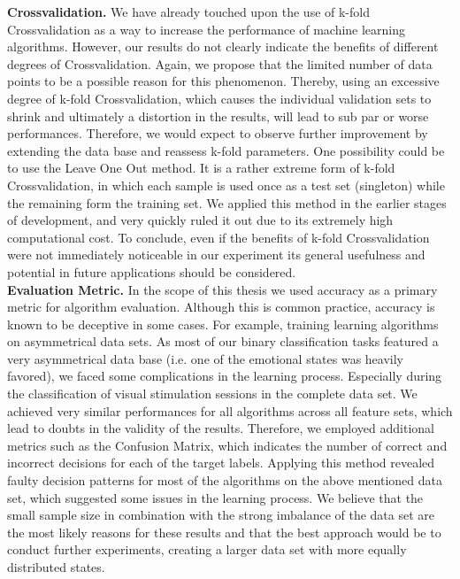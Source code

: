 \textbf{Crossvalidation.} We have already touched upon the use of k-fold Crossvalidation as a way to increase the performance of machine learning algorithms.
However, our results do not clearly indicate the benefits of different degrees of Crossvalidation. Again, we propose that the limited number of data points to be a possible reason for this phenomenon. Thereby, using an excessive degree of k-fold Crossvalidation, which causes the individual validation sets to shrink and ultimately a distortion in the results, will lead to sub par or worse performances. Therefore, we would expect to observe further improvement by extending the data base and reassess k-fold parameters. One possibility could be to use the Leave One Out method. It is a rather extreme form of k-fold Crossvalidation, in which each sample is used once as a test set (singleton) while the remaining form the training set. We applied this method in the earlier stages of development, and very quickly ruled it out due to its extremely high computational cost. To conclude, even if the benefits of k-fold Crossvalidation were not immediately noticeable in our experiment its general usefulness and potential in future applications should be considered.\\[10pt]
\textbf{Evaluation Metric.}
In the scope of this thesis we used accuracy as a primary metric for algorithm evaluation. Although this is common practice, accuracy is known to be deceptive in some cases. For example, training learning algorithms on asymmetrical data sets. As most of our binary classification tasks featured a very asymmetrical data base (i.e. one of the emotional states was heavily favored), we faced some complications in the learning process. Especially during the classification of visual stimulation sessions in the complete data set. We achieved very similar performances for all algorithms across all feature sets, which lead to doubts in the validity of the results. Therefore, we employed additional metrics such as the Confusion Matrix, which indicates the number of correct and incorrect decisions for each of the target labels. Applying this method revealed faulty decision patterns for most of the algorithms on the above mentioned data set, which suggested some issues in the learning process. We believe that the small sample size in combination with the strong imbalance of the data set are the most likely reasons for these results and that the best approach would be to conduct further experiments, creating a larger data set with more equally distributed states. \\[10pt] 
